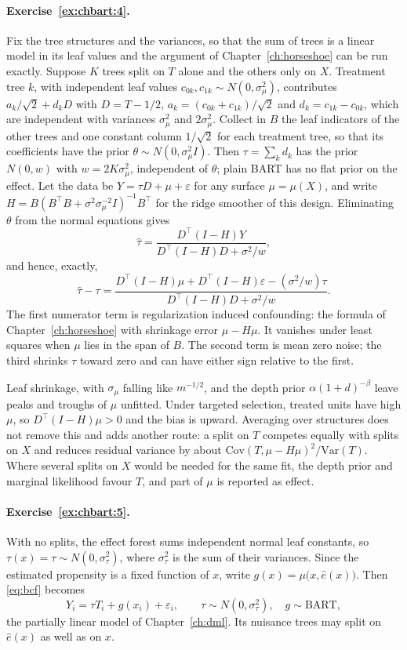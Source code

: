 \paragraph{Exercise~\ref{ex:chbart:4}.} Fix the tree structures and the variances, so that the sum of trees is a linear model in its leaf values and the argument of Chapter~\ref{ch:horseshoe} can be run exactly. Suppose $K$ trees split on $T$ alone and the others only on $X$. Treatment tree $k$, with independent leaf values $c_{0k}, c_{1k} \sim N(0, \sigma_\mu^2)$, contributes $a_k/\sqrt 2 + d_kD$ with $D = T - 1/2$, $a_k = (c_{0k} + c_{1k})/\sqrt 2$ and $d_k = c_{1k} - c_{0k}$, which are independent with variances $\sigma_\mu^2$ and $2\sigma_\mu^2$. Collect in $B$ the leaf indicators of the other trees and one constant column $1/\sqrt 2$ for each treatment tree, so that its coefficients have the prior $\theta \sim N(0, \sigma_\mu^2I)$. Then $\tau = \sum_kd_k$ has the prior $N(0, w)$ with $w = 2K\sigma_\mu^2$, independent of $\theta$; plain BART has no flat prior on the effect. Let the data be $Y = \tau D + \mu + \varepsilon$ for any surface $\mu = \mu(X)$, and write $H = B(B^\top B + \sigma^2\sigma_\mu^{-2}I)^{-1}B^\top$ for the ridge smoother of this design. Eliminating $\theta$ from the normal equations gives
\[
\hat\tau = \frac{D^\top(I - H)Y}{D^\top(I - H)D + \sigma^2/w},
\]
and hence, exactly,
\[
\hat\tau - \tau = \frac{D^\top(I - H)\mu + D^\top(I - H)\varepsilon - (\sigma^2/w)\tau}{D^\top(I - H)D + \sigma^2/w}.
\]
The first numerator term is regularization induced confounding: the formula of Chapter~\ref{ch:horseshoe} with shrinkage error $\mu - H\mu$. It vanishes under least squares when $\mu$ lies in the span of $B$. The second term is mean zero noise; the third shrinks $\tau$ toward zero and can have either sign relative to the first.

Leaf shrinkage, with $\sigma_\mu$ falling like $m^{-1/2}$, and the depth prior $\alpha(1 + d)^{-\beta}$ leave peaks and troughs of $\mu$ unfitted. Under targeted selection, treated units have high $\mu$, so $D^\top(I - H)\mu > 0$ and the bias is upward. Averaging over structures does not remove this and adds another route: a split on $T$ competes equally with splits on $X$ and reduces residual variance by about $\mathrm{Cov}(T, \mu - H\mu)^2/\mathrm{Var}(T)$. Where several splits on $X$ would be needed for the same fit, the depth prior and marginal likelihood favour $T$, and part of $\mu$ is reported as effect.

\paragraph{Exercise~\ref{ex:chbart:5}.} With no splits, the effect forest sums independent normal leaf constants, so $\tau(x) = \tau \sim N(0, \sigma_\tau^2)$, where $\sigma_\tau^2$ is the sum of their variances. Since the estimated propensity is a fixed function of $x$, write $g(x) = \mu\bigl(x, \hat e(x)\bigr)$. Then \eqref{eq:bcf} becomes
\[
Y_i = \tau T_i + g(x_i) + \varepsilon_i, \qquad \tau \sim N(0, \sigma_\tau^2), \quad g \sim \text{BART},
\]
the partially linear model of Chapter~\ref{ch:dml}. Its nuisance trees may split on $\hat e(x)$ as well as on $x$.

